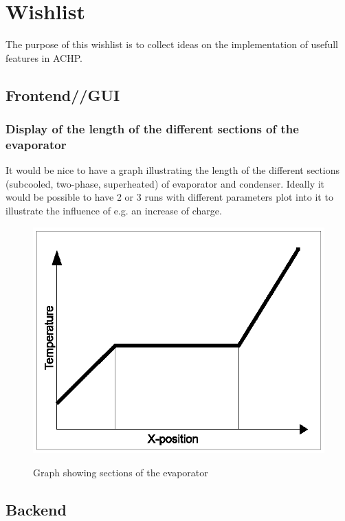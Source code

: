 \documentclass[]{article}
\begin{document}
\section{Wishlist}
The purpose of this wishlist is to collect ideas on the implementation of usefull features in ACHP.

\subsection{Frontend//GUI}
\subsubsection{Display of the length of the different sections of the evaporator}
It would be nice to have a graph illustrating the length of the different sections
(subcooled, two-phase, superheated) of evaporator and condenser. Ideally it would be possible
to have 2 or 3 runs with different parameters plot into it to illustrate the influence
of e.g. an increase of charge.
  
\begin{figure}[htbp]
	\centering
		\includegraphics{wishlist_drawings_section_graph.eps}
	\label{fig:wishlist_drawings_section_graph}
	\caption{Graph showing sections of the evaporator}
\end{figure}


\subsection{Backend}
\end{document}

